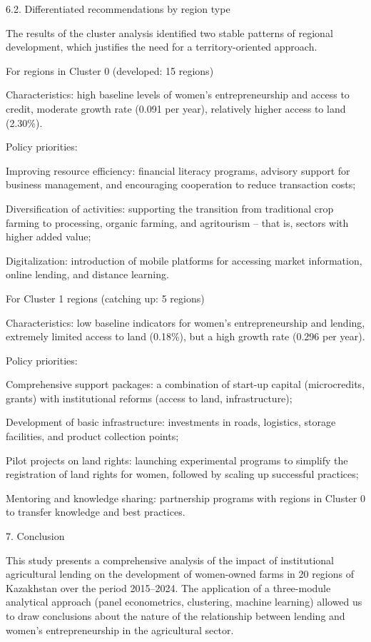 \documentclass[
]{article}
\begin{document}
6.2. Differentiated recommendations by region type

The results of the cluster analysis identified two stable patterns of
regional development, which justifies the need for a territory-oriented
approach.

For regions in Cluster 0 (developed: 15 regions)

Characteristics: high baseline levels of women's entrepreneurship and
access to credit, moderate growth rate (0.091 per year), relatively
higher access to land (2.30\%).

Policy priorities:

Improving resource efficiency: financial literacy programs, advisory
support for business management, and encouraging cooperation to reduce
transaction costs;

Diversification of activities: supporting the transition from
traditional crop farming to processing, organic farming, and agritourism
-- that is, sectors with higher added value;

Digitalization: introduction of mobile platforms for accessing market
information, online lending, and distance learning.

For Cluster 1 regions (catching up: 5 regions)

Characteristics: low baseline indicators for women's entrepreneurship
and lending, extremely limited access to land (0.18\%), but a high
growth rate (0.296 per year).

Policy priorities:

Comprehensive support packages: a combination of start-up capital
(microcredits, grants) with institutional reforms (access to land,
infrastructure);

Development of basic infrastructure: investments in roads, logistics,
storage facilities, and product collection points;

Pilot projects on land rights: launching experimental programs to
simplify the registration of land rights for women, followed by scaling
up successful practices;

Mentoring and knowledge sharing: partnership programs with regions in
Cluster 0 to transfer knowledge and best practices.

7. Conclusion

This study presents a comprehensive analysis of the impact of
institutional agricultural lending on the development of women-owned
farms in 20 regions of Kazakhstan over the period 2015--2024. The
application of a three-module analytical approach (panel econometrics,
clustering, machine learning) allowed us to draw conclusions about the
nature of the relationship between lending and women's entrepreneurship
in the agricultural sector.
\end{document}
